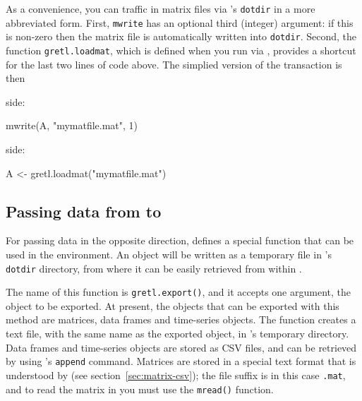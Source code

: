 As a convenience, you can traffic in matrix files via 's
\texttt{dotdir} in a more abbreviated form. First, \texttt{mwrite} has
an optional third (integer) argument: if this is non-zero then the
matrix file is automatically written into \texttt{dotdir}.  Second,
the function \texttt{gretl.loadmat}, which is defined when you run
 via , provides a shortcut for the last two lines of
 code above. The simplied version of the transaction is then

 side:
\begin{code}
  mwrite(A, "mymatfile.mat", 1)
\end{code}
 side:
\begin{code}
  A <- gretl.loadmat("mymatfile.mat")
\end{code}

\subsection{Passing data from  to }
\label{sec:Rpassing-data}

For passing data in the opposite direction,  defines a
special function that can be used in the  environment. An
 object will be written as a temporary file in 's
\texttt{dotdir} directory, from where it can be easily retrieved from
within .

The name of this function is \texttt{gretl.export()}, and it accepts
one argument, the object to be exported. At present, the objects that
can be exported with this method are matrices, data frames and
time-series objects. The function creates a text file, with the same
name as the exported object, in 's temporary
directory. Data frames and time-series objects are stored as CSV
files, and can be retrieved by using 's \texttt{append}
command.  Matrices are stored in a special text format that is
understood by  (see section~\ref{sec:matrix-csv}); the file
suffix is in this case \texttt{.mat}, and to read the matrix in
 you must use the \texttt{mread()} function.

